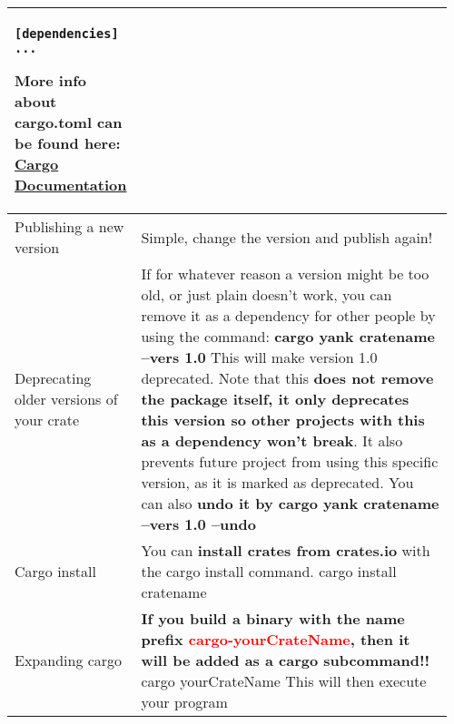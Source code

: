 \documentclass[main.tex,fontsize=8pt,paper=a4,paper=portrait,DIV=calc,]{scrartcl}
\begin{document}
\begin{table}[ht!]
\begin{tabular}{|m{0.2\linewidth}|m{0.755\linewidth}|}
\begin{lstlisting}
[dependencies]
...
\end{lstlisting}
\textcolor{OliveGreen}{More info about cargo.toml can be found here: \href{https://doc.rust-lang.org/cargo/}{Cargo Documentation}}\\
\hline
Publishing a new version & 
\textcolor{OliveGreen}{Simple, change the version and publish again!}\\
\hline
Deprecating older versions of your crate & 
If for whatever reason a version might be too old, or just plain doesn't work, you can remove it as a dependency for other people by using the command:\newline
\textbf{cargo yank cratename --vers 1.0}\newline
This will make version 1.0 deprecated. Note that this \textbf{does not remove the package itself, it only deprecates this version so other projects with this as a dependency won't break}.\newline
It also prevents future project from using this specific version, as it is marked as deprecated.\newline
You can also \textbf{undo it by cargo yank cratename --vers 1.0 --undo}\\
\hline
Cargo install &
You can \textbf{install crates from crates.io} with the cargo install command.\newline
\textcolor{OliveGreen}{cargo install cratename}\\
\hline
Expanding cargo & 
\textbf{If you build a binary with the name prefix \textcolor{red}{cargo-yourCrateName}, then it will be added as a cargo subcommand!!}\newline
\textcolor{OliveGreen}{cargo yourCrateName} This will then execute your program\\
\hline
\end{tabular}

\end{table}
\end{document}
